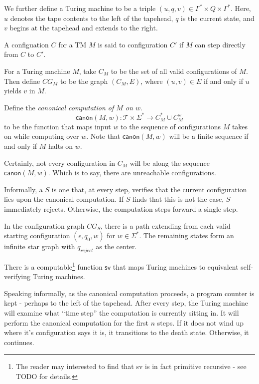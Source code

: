 \documentclass[11pt, titlepage]{article}
\begin{document}
We further define a Turing machine  to be a triple
$(u, q, v) \in \Gamma^* \times Q \times \Gamma^*$. Here, $u$ denotes
the tape contents to the left of the tapehead, $q$ is the current
state, and $v$ begins at the tapehead and extends to the right.

A configuation $C$ for a TM $M$ is said to  configuration
$C'$ if $M$ can step directly from $C$ to $C'$.

For a Turing machine $M$, take $C_M$ to be the set of all valid
configurations of $M$. Then define $CG_M$ to be the graph $(C_M, E)$,
where $(u,v) \in E$ if and only if $u$ yields $v$ in $M$.
\begin{definition}
Define the \emph{canonical computation of $M$ on $w$}.
\[
  \textsf{canon}(M, w) : \mathcal{T} \times \Sigma^*
      \rightarrow
       C_M^*\cup C_M^\omega
\]
to be the function that maps input $w$ to the sequence of
configurations $M$ takes on while computing over $w$. Note that
$\textsf{canon}(M, w)$ will be a finite sequence if and only if $M$
halts on $w$.
\end{definition}

Certainly, not every configuration in $C_M$ will be along the sequence
$\textsf{canon}(M,w)$. Which is to say, there are unreachable
configurations.

Informally, a  $S$ is one that, at
every step, verifies that the current configuration lies upon the
canonical computation. If $S$ finds that this is not the case, $S$
immediately rejects. Otherwise, the computation steps forward a single
step.

In the configuration graph $CG_S$, there is a path extending from each
valid starting configuration $(\epsilon, q_0, w)$ for $w \in \Sigma^*$. The remaining states form an infinite star graph with $q_{reject}$ as the center.

\begin{proposition}
  There is a computable\footnote{The reader may interested to find
  that \textsf{sv} is in fact primitive recursive - see TODO for
  details.} function $\textsf{sv}$ that maps Turing machines to
  equivalent self-verifying Turing machines.
\end{proposition}

Speaking informally, as the canonical computation proceeds, a program
counter is kept - perhaps to the left of the tapehead. After every
step, the Turing machine will examine what ``time step'' the
computation is currently sitting in. It will perform the canonical
computation for the first $n$ steps. If it does not wind up where it's
configuration says it is, it transitions to the death
state. Otherwise, it continues.
\end{document}
